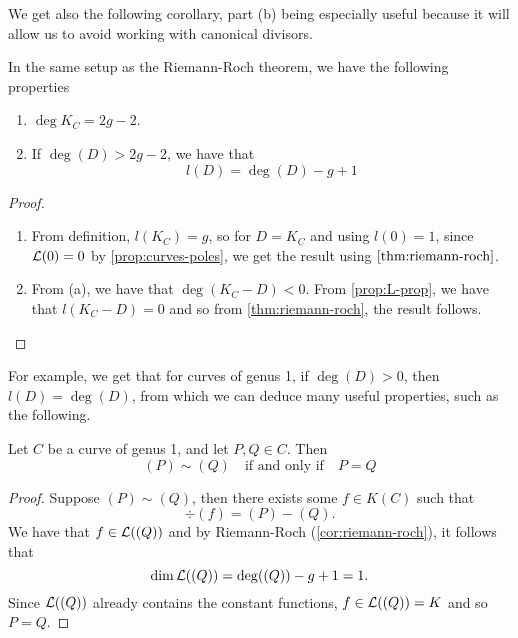 We get also the following corollary, part (b) being especially useful
because it will allow us to avoid working
with canonical divisors.

\begin{corollary}
	\label{cor:riemann-roch}
	In the same setup as the Riemann-Roch theorem, we have the following properties
	\begin{enumerate}[itemsep=0em, label=(\alph*)]
		\item $\deg K_C = 2g - 2$.
		\item If $\deg(D) > 2g - 2$, we have that
			\begin{equation*}
				l(D) = \deg(D) - g + 1
			\end{equation*}	
	\end{enumerate}
\end{corollary}

\begin{proof}
	\begin{enumerate}[itemsep=0em, label=(\alph*)]
		\item From definition, $l(K_C) = g$, so for $D = K_C$ and using 
			$l(0) = 1$, since $\mathcal{L}(0) = 0$ by \ref{prop:curves-poles}, we get the
			result using $\ref{thm:riemann-roch}$.
		\item From (a), we have that $\deg(K_C - D) < 0$. From
			\ref{prop:L-prop}, we have that $l(K_C - D) = 0$ and so
			from \ref{thm:riemann-roch}, the result follows.
	\end{enumerate}
\end{proof}

For example, we get that for curves of genus 1, if $\deg(D) > 0$,
then $l(D) = \deg(D)$, from which we can deduce many useful properties, such
as the following.

\begin{proposition}
	\label{prop:sim-implies-eq}
	Let $C$ be a curve of genus 1, and let $P, Q \in C$. Then
	\begin{equation*}
		(P) \sim (Q)
		\quad\textrm{if and only if}\quad
		P = Q
	\end{equation*}
\end{proposition}

\begin{proof}
	Suppose $(P) \sim (Q)$, then there exists some $f \in K(C)$ such that
	\begin{equation*}
		\div(f) = (P) - (Q).
	\end{equation*}
	We have that $f \in \mathcal{L}((Q))$ and by Riemann-Roch (\ref{cor:riemann-roch}),
	it follows that
	\begin{equation*}
		\dim \mathcal{L}((Q)) = \deg((Q)) - g + 1 = 1.
	\end{equation*}
	Since $\mathcal{L}((Q))$ already contains the constant functions, $f \in \mathcal{L}((Q)) = K$
	and so $P = Q$.
\end{proof}

